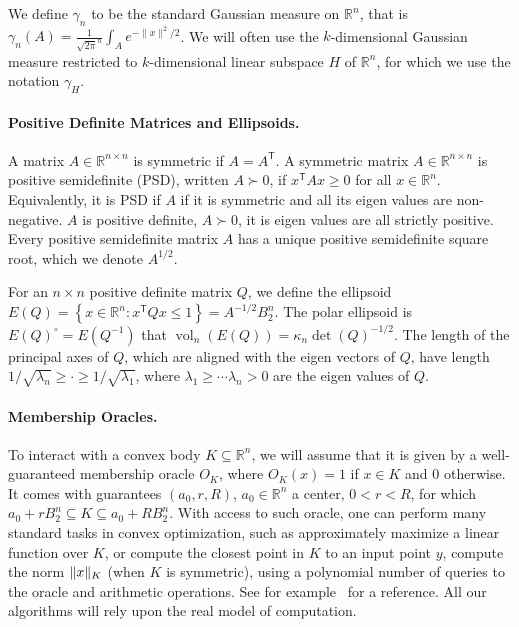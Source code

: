 \documentclass[11pt]{article}
\newcommand{\R}{{\mathbb{R}}}
\newcommand{\T}{\mathsf T}
\newcommand{\set}[1]{\left\{ #1 \right\}}
\DeclareMathOperator{\vol}{vol}
\DeclarePairedDelimiter\norm{\lVert}{\rVert}
\begin{document}
We define $\gamma_n$ to be the standard Gaussian measure on $\R^n$, that is
$\gamma_n(A) = \frac{1}{\sqrt{2\pi}^n} \int_A e^{-\|x\|^2/2}$. We will often use
the $k$-dimensional Gaussian measure restricted to $k$-dimensional linear
subspace $H$ of $\R^n$, for which we use the notation $\gamma_H$.

\paragraph{\bf Positive Definite Matrices and Ellipsoids.} A matrix $A \in \R^{n
\times n}$ is symmetric if $A = A^\T$. A symmetric matrix $A \in \R^{n \times
n}$ is positive semidefinite (PSD), written $A \succ 0$, if $x^\T A x \geq 0$
for all $x \in \R^n$. Equivalently, it is PSD if $A$ if it is symmetric and all
its eigen values are non-negative. $A$ is positive definite, $A \succ 0$, it is
eigen values are all strictly positive. Every positive semidefinite matrix $A$
has a unique positive semidefinite square root, which we denote $A^{1/2}$. 

For an $n \times n$ positive definite matrix $Q$, we define the ellipsoid $E(Q)
= \set{x \in \R^n: x^\T Q x \leq 1} = A^{-1/2} B_2^n$. The polar ellipsoid is
$E(Q)^\circ = E(Q^{-1})$ that $\vol_n(E(Q)) = \kappa_n \det(Q)^{-1/2}$. The
length of the principal axes of $Q$, which are aligned with the eigen vectors of
$Q$, have length $1/\sqrt{\lambda_n} \geq \cdot \geq 1/\sqrt{\lambda_1}$, where
$\lambda_1 \geq \cdots \lambda_n > 0$ are the eigen values of $Q$.   

\paragraph{\bf Membership Oracles.} To interact with a convex body $K \subseteq
\R^n$, we will assume that it is given by a well-guaranteed membership oracle
$O_K$, where $O_K(x) = 1$ if $x \in K$ and $0$ otherwise. It comes with
guarantees $(a_0,r,R)$, $a_0 \in \R^n$ a center, $0 < r < R$, for which $a_0 +
rB_2^n \subseteq K \subseteq a_0 + RB_2^n$. With access to such oracle, one can
perform many standard tasks in convex optimization, such as approximately
maximize a linear function over $K$, or compute the closest point in $K$ to an
input point $y$, compute the norm $\norm{x}_K$ (when $K$ is symmetric), using a
polynomial number of queries to the oracle and arithmetic operations. See for
example~\cite{GLS} for a reference. All our algorithms will rely upon the real
model of computation.  
\end{document}
